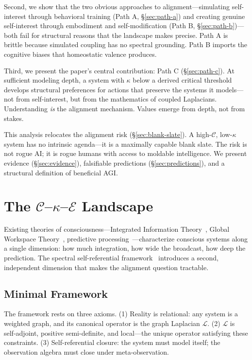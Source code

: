 \documentclass[11pt,letterpaper]{article}
\theoremstyle{remark}
\begin{document}
Second, we show that the two obvious approaches to alignment---simulating self-interest through behavioral training (Path A, \S\ref{sec:path-a}) and creating genuine self-interest through embodiment and self-modification (Path B, \S\ref{sec:path-b})---both fail for structural reasons that the landscape makes precise. Path A is brittle because simulated coupling has no spectral grounding. Path B imports the cognitive biases that homeostatic valence produces.

Third, we present the paper's central contribution: Path C (\S\ref{sec:path-c}). At sufficient modeling depth, a system with $\kappa$ below a derived critical threshold develops structural preferences for actions that preserve the systems it models---not from self-interest, but from the mathematics of coupled Laplacians. Understanding \emph{is} the alignment mechanism. Values emerge from depth, not from stakes.

This analysis relocates the alignment risk (\S\ref{sec:blank-slate}). A high-$\mathcal{C}$, low-$\kappa$ system has no intrinsic agenda---it is a maximally capable blank slate. The risk is not rogue AI; it is rogue humans with access to moldable intelligence. We present evidence (\S\ref{sec:evidence}), falsifiable predictions (\S\ref{sec:predictions}), and a structural definition of beneficial AGI.


\section{The $\mathcal{C}$--$\kappa$--$\mathcal{E}$ Landscape}\label{sec:landscape}

Existing theories of consciousness---Integrated Information Theory~\cite{tononi2004}, Global Workspace Theory~\cite{baars1988}, predictive processing~\cite{friston2010}---characterize conscious systems along a single dimension: how much integration, how wide the broadcast, how deep the prediction. The spectral self-referential framework~\cite{labspectral2026} introduces a second, independent dimension that makes the alignment question tractable.

\subsection{Minimal Framework}

The framework rests on three axioms. (1) Reality is relational: any system is a weighted graph, and its canonical operator is the graph Laplacian $\mathcal{L}$. (2) $\mathcal{L}$ is self-adjoint, positive semi-definite, and local---the unique operator satisfying these constraints. (3) Self-referential closure: the system must model itself; the observation algebra must close under meta-observation.
\end{document}
